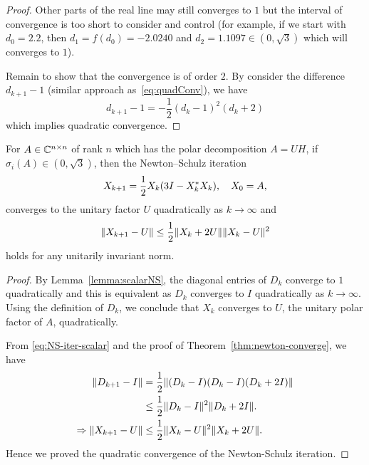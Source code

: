 \documentclass[12pt]{article}
\begin{document}
\begin{proof}
    Other parts of the real line may still converges to $1$ but the interval of convergence is too short to consider and control (for example, if we start with $d_0 = 2.2$, then $d_1 = f(d_0) = -2.0240$ and $d_2 = 1.1097 \in (0,\sqrt{3})$ which will converges to $1$).

    Remain to show that the convergence is of order $2$. By consider the difference $d_{k+1} - 1$ (similar approach as~\eqref{eq:quadConv}), we have 
    \begin{equation}\label{eq:NS-iter-scalar}
        d_{k+1} - 1 = -\frac 12 (d_k-1)^2 (d_k + 2)
    \end{equation}
    which implies quadratic convergence.
\end{proof}

\begin{theorem}
    \label{thm:newtonSchulzConverge}
    For $A\in\mathbb{C}^{n\times n}$ of rank $n$ which has the polar decomposition $A = UH$, if $\sigma_i(A) \in (0,\sqrt{3})$, then the Newton--Schulz iteration 
    \begin{equation}\notag
        X_{k+1} = \frac 12 X_k(3I-X_k^* X_k),\quad X_0 = A,
    \end{equation}
    converges to the unitary factor $U$ quadratically as $k\to\infty$ and 
    \begin{equation}\label{eq:NSconv}
        \|{X_{k+1} - U}\| \leq \frac 12 \|{X_k + 2U}\| \|{X_k - U}\|^2
    \end{equation}
    holds for any unitarily invariant norm.
\end{theorem}

\begin{proof}
    By Lemma~\ref{lemma:scalarNS}, the diagonal entries of $D_k$ converge to $1$ quadratically and this is equivalent as $D_k$ converges to $I$ quadratically as $k\to\infty$. Using the definition of $D_k$, we conclude that $X_k$ converges to $U$, the unitary polar factor of $A$, quadratically.

    From \eqref{eq:NS-iter-scalar} and the proof of Theorem~\ref{thm:newton-converge}, we have 
    \begin{equation}
        \notag 
        \begin{aligned}
            \|{D_{k+1} - I}\| &= \frac{1}{2}\|{(D_k - I)(D_k - I)(D_k + 2I)}\| \\
            & \leq \frac{1}{2}\|{D_k - I}\|^2 \|{D_k + 2I}\|.\\
            \Rightarrow 
            \|{X_{k+1} - U}\| &\leq \frac{1}{2} \|{X_k - U}\|^2 \|{X_k + 2U}\|.
        \end{aligned}
    \end{equation}
    Hence we proved the quadratic convergence of the Newton-Schulz iteration.
\end{proof}
\end{document}
